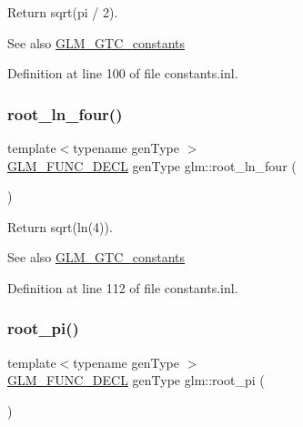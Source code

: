 Return sqrt(pi / 2). \begin{DoxySeeAlso}{See also}
\hyperlink{group__gtc__constants}{G\+L\+M\+\_\+\+G\+T\+C\+\_\+constants} 
\end{DoxySeeAlso}


Definition at line 100 of file constants.\+inl.

\mbox{\label{group__gtc__constants_ga9cae3fad9314e34c1d3aab71fcdef05f}} 
\subsubsection{\texorpdfstring{root\+\_\+ln\+\_\+four()}{root\_ln\_four()}}
{\footnotesize\ttfamily template$<$typename gen\+Type $>$ \\
\hyperlink{setup_8hpp_ab2d052de21a70539923e9bcbf6e83a51}{G\+L\+M\+\_\+\+F\+U\+N\+C\+\_\+\+D\+E\+CL} gen\+Type glm\+::root\+\_\+ln\+\_\+four (\begin{DoxyParamCaption}{ }\end{DoxyParamCaption})}

Return sqrt(ln(4)). \begin{DoxySeeAlso}{See also}
\hyperlink{group__gtc__constants}{G\+L\+M\+\_\+\+G\+T\+C\+\_\+constants} 
\end{DoxySeeAlso}


Definition at line 112 of file constants.\+inl.

\mbox{\label{group__gtc__constants_ga1cfeb345f34f72697d14f4db8d5d4c6c}} 
\subsubsection{\texorpdfstring{root\+\_\+pi()}{root\_pi()}}
{\footnotesize\ttfamily template$<$typename gen\+Type $>$ \\
\hyperlink{setup_8hpp_ab2d052de21a70539923e9bcbf6e83a51}{G\+L\+M\+\_\+\+F\+U\+N\+C\+\_\+\+D\+E\+CL} gen\+Type glm\+::root\+\_\+pi (\begin{DoxyParamCaption}{ }\end{DoxyParamCaption})}

